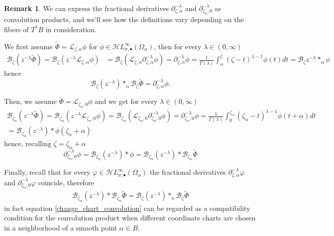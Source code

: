 \documentclass{article}
\newcommand{\singexp}[2]{\mathcal{H}L^\infty_{#1, #2}}
\newcommand{\singexpalg}[1]{\singexp{#1}{\bullet}}
\theoremstyle{definition}
\newcommand{\series}[1]{\tilde{#1}}
\newcommand{\fracderiv}[3]{\partial^{#1}_{#2, #3}}
\newcommand{\laplace}{\mathcal{L}}
\newcommand{\borel}{\mathcal{B}}
\newtheorem{remark}[definition]{Remark}
\theoremstyle{plain}
\begin{document}
\begin{remark}
We can express the fractional derivatives $\fracderiv{-\lambda}{\zeta}{\alpha}$ and $\fracderiv{-\lambda}{\zeta_\alpha}{0}$ as convolution products, and we’ll see how the definitions vary depending on the fibers of $T^*B$ in consideration. 

We first assume $\series{\Phi}=\laplace_{\zeta,\alpha}\phi$ for $\phi\in\singexpalg{\sigma}(\Omega_\alpha)$, then for every $\lambda\in (0,\infty)$
\begin{align*}
    \borel_\zeta(z^{-\lambda}\series{\Phi})=\borel_\zeta(z^{-\lambda}\laplace_{\zeta,\alpha}\phi)&=\borel_\zeta(\laplace_{\zeta,\alpha}\partial_{\zeta,\alpha}^{-\lambda}\phi)=\partial_{\zeta,\alpha}^{-\lambda}\phi=\frac{1}{\Gamma(\lambda)}\int_{\alpha}^\zeta (\zeta-t)^{\lambda-1}\phi(t)dt=\borel_\zeta z^{-\lambda}\ast_\alpha\phi
\end{align*}
hence \[\borel_\zeta (z^{-\lambda})\ast_\alpha\borel_\zeta\series{\Phi}=\fracderiv{-\lambda}{\zeta}{\alpha}\phi.\]

Then, we assume $\series{\Phi}=\laplace_{\zeta_\alpha,0}\phi$ and we get for every $\lambda\in (0,\infty)$
\begin{multline*}
    \borel_{\zeta_\alpha}(z^{-\lambda}\series{\Phi})=\borel_{\zeta_\alpha}(z^{-\lambda}\laplace_{\zeta_\alpha,0}\phi)=\borel_{\zeta_\alpha}(\laplace_{\zeta_\alpha,0}\partial_{\zeta_\alpha,0}^{-\lambda}\phi)=\partial_{\zeta_\alpha,0}^{-\lambda}\phi=\frac{1}{\Gamma(\lambda)}\int_{0}^{\zeta_\alpha} (\zeta_\alpha-t)^{\lambda-1}\phi(t+\alpha)dt\\
    =\borel_{\zeta_\alpha}(z^{-\lambda})\ast\phi(\zeta_\alpha+\alpha)
\end{multline*}
hence, recalling $\zeta=\zeta_\alpha+\alpha$ \[\partial_{\zeta_\alpha,0}^{-\lambda}\phi=\borel_{\zeta_\alpha} (z^{-\lambda})\ast\phi=\borel_{\zeta_\alpha} (z^{-\lambda})\ast\borel_{\zeta_\alpha}\series{\Phi}\]

Finally, recall that for every $\varphi\in\singexpalg{\sigma}(\Omega_\alpha)$ the fractional derivatives $\fracderiv{-\lambda}{\zeta}{\alpha}\varphi$ and 
$\fracderiv{-\lambda}{\zeta_\alpha}{0}\varphi$ coincide, therefore 
\begin{align}\label{change_chart_convolution}
    \borel_{\zeta_\alpha} (z^{-\lambda})\ast\borel_{\zeta_\alpha}\series{\Phi}=\borel_\zeta (z^{-\lambda})\ast_\alpha\borel_\zeta\series{\Phi}
\end{align}
in fact equation \eqref{change_chart_convolution} can be regarded as a compatibility condition for the convolution product when different coordinate charts are chosen in a neighborhood of a smooth point $\alpha\in B$.  
\end{remark}
\end{document}
